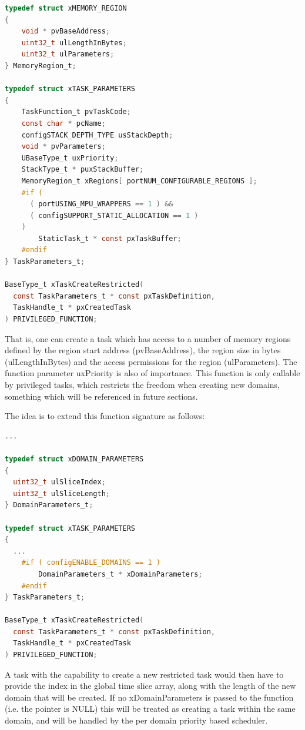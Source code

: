\begin{lstlisting}[language={c}, caption={xTaskCreateRestricted function signature}, label={lst:create_restricted}]
typedef struct xMEMORY_REGION
{
    void * pvBaseAddress;
    uint32_t ulLengthInBytes;
    uint32_t ulParameters;
} MemoryRegion_t;

typedef struct xTASK_PARAMETERS
{
    TaskFunction_t pvTaskCode;
    const char * pcName;
    configSTACK_DEPTH_TYPE usStackDepth;
    void * pvParameters;
    UBaseType_t uxPriority;
    StackType_t * puxStackBuffer;
    MemoryRegion_t xRegions[ portNUM_CONFIGURABLE_REGIONS ];
    #if ( 
      ( portUSING_MPU_WRAPPERS == 1 ) && 
      ( configSUPPORT_STATIC_ALLOCATION == 1 ) 
    )
        StaticTask_t * const pxTaskBuffer;
    #endif
} TaskParameters_t;

BaseType_t xTaskCreateRestricted( 
  const TaskParameters_t * const pxTaskDefinition, 
  TaskHandle_t * pxCreatedTask 
) PRIVILEGED_FUNCTION;
\end{lstlisting}

That is, one can create a task which has access to a number of memory regions
defined by the region start address (pvBaseAddress), the region size in bytes
(ulLengthInBytes) and the access permissions for the region (ulParameters). The
function parameter uxPriority is also of importance. This function is only
callable by privileged tasks, which restricts the freedom when creating new
domains, something which will be referenced in future sections.

The idea is to extend this function signature as follows:

\begin{lstlisting}[language={c}, caption={Extended parameters and signature}, label={lst:extended_create_restricted}]
...

typedef struct xDOMAIN_PARAMETERS
{
  uint32_t ulSliceIndex;
  uint32_t ulSliceLength;
} DomainParameters_t;

typedef struct xTASK_PARAMETERS
{
  ...
    #if ( configENABLE_DOMAINS == 1 )
        DomainParameters_t * xDomainParameters; 
    #endif
} TaskParameters_t;

BaseType_t xTaskCreateRestricted( 
  const TaskParameters_t * const pxTaskDefinition, 
  TaskHandle_t * pxCreatedTask 
) PRIVILEGED_FUNCTION;
\end{lstlisting}

A task with the capability to create a new restricted task would then have to
provide the index in the global time slice array, along with the length of the
new domain that will be created. If no xDomainParameters is passed to the
function (i.e. the pointer is NULL) this will be treated as creating a task
within the same domain, and will be handled by the per domain priority based
scheduler.

